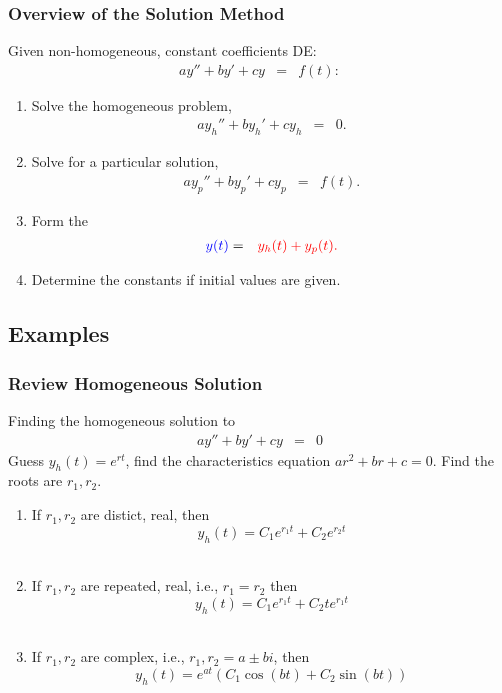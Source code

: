\begin{frame}
  \frametitle{Overview of the Solution Method}

  Given non-homogeneous, constant coefficients DE:
  \begin{eqnarray*}
    a y'' + by' + cy & = & f(t):
  \end{eqnarray*}
  \begin{enumerate}
  \item Solve the homogeneous problem,
    \begin{eqnarray*}
      a y_h'' + by_h' + cy_h & = & 0.
    \end{eqnarray*}
  \item Solve for a particular solution,
    \begin{eqnarray*}
      a y_p'' + by_p' + cy_p & = & f(t).
    \end{eqnarray*}
  \item Form the 
    \begin{eqnarray*}
      {\color{blue}y(t)} & = & {\color{red}y_h(t) + y_p(t).}
    \end{eqnarray*}
  \item Determine the constants if initial values are given. \\
    \textbf{}
  \end{enumerate}


\end{frame}

\subsection{Examples}

\begin{frame}
  \frametitle{Review Homogeneous Solution}
   Finding the homogeneous solution to
     \begin{eqnarray*}
      a y'' + b y' + cy  & =& 0
    \end{eqnarray*}
   Guess
       {\color{red}$y_h(t)=e^{rt}$}, find the characteristics equation
       {\color{red}$ar^2+br+c = 0.$}
  Find the roots are {\color{red}$r_1, r_2$}.
  \begin{enumerate}
  \item If {\color{blue}$r_1, r_2$ are distict, real}, then
      {\color{red}$$y_h(t) = C_1e^{r_1t}+C_2e^{r_2t}$$}\\
  \item If {\color{blue}$r_1, r_2$ are repeated, real}, i.e., $r_1 = r_2$ then
     {\color{red}$$y_h(t) = C_1e^{r_1t}+C_2te^{r_1t}$$}\\
  \item If {\color{blue}$r_1, r_2$ are complex}, i.e., $r_1, r_2 = a\pm bi$,
      then
      {\color{red}$$y_h(t) = e^{at}\left(C_1\cos(bt)+C_2\sin(bt)\right)$$}
  \end{enumerate}

\end{frame}


